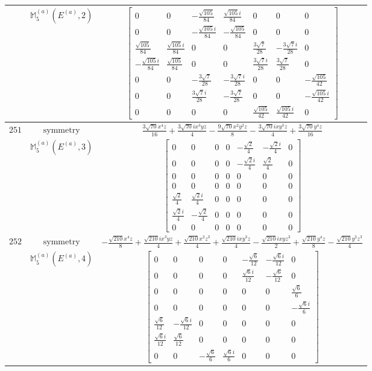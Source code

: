 \documentclass[fleqn,8pt,landscape]{jsarticle}
\begin{document}
\begin{longtable}{ccc}
$  $ & $ \mathbb{M}_{5}^{(a)}(E^{(a)},2) $ & $ \begin{bmatrix} 0 & 0 & - \frac{\sqrt{105}}{84} & \frac{\sqrt{105} i}{84} & 0 & 0 & 0 \\ 0 & 0 & - \frac{\sqrt{105} i}{84} & - \frac{\sqrt{105}}{84} & 0 & 0 & 0 \\ \frac{\sqrt{105}}{84} & \frac{\sqrt{105} i}{84} & 0 & 0 & \frac{3 \sqrt{7}}{28} & - \frac{3 \sqrt{7} i}{28} & 0 \\ - \frac{\sqrt{105} i}{84} & \frac{\sqrt{105}}{84} & 0 & 0 & \frac{3 \sqrt{7} i}{28} & \frac{3 \sqrt{7}}{28} & 0 \\ 0 & 0 & - \frac{3 \sqrt{7}}{28} & - \frac{3 \sqrt{7} i}{28} & 0 & 0 & - \frac{\sqrt{105}}{42} \\ 0 & 0 & \frac{3 \sqrt{7} i}{28} & - \frac{3 \sqrt{7}}{28} & 0 & 0 & - \frac{\sqrt{105} i}{42} \\ 0 & 0 & 0 & 0 & \frac{\sqrt{105}}{42} & \frac{\sqrt{105} i}{42} & 0 \end{bmatrix} $ \\ \hline
$ 251 $ & $ \text{symmetry} $ & $ \frac{3 \sqrt{70} x^{4} z}{16} + \frac{3 \sqrt{70} i x^{3} y z}{4} - \frac{9 \sqrt{70} x^{2} y^{2} z}{8} - \frac{3 \sqrt{70} i x y^{3} z}{4} + \frac{3 \sqrt{70} y^{4} z}{16} $ \\
$  $ & $ \mathbb{M}_{5}^{(a)}(E^{(a)},3) $ & $ \begin{bmatrix} 0 & 0 & 0 & 0 & - \frac{\sqrt{2}}{4} & - \frac{\sqrt{2} i}{4} & 0 \\ 0 & 0 & 0 & 0 & - \frac{\sqrt{2} i}{4} & \frac{\sqrt{2}}{4} & 0 \\ 0 & 0 & 0 & 0 & 0 & 0 & 0 \\ 0 & 0 & 0 & 0 & 0 & 0 & 0 \\ \frac{\sqrt{2}}{4} & \frac{\sqrt{2} i}{4} & 0 & 0 & 0 & 0 & 0 \\ \frac{\sqrt{2} i}{4} & - \frac{\sqrt{2}}{4} & 0 & 0 & 0 & 0 & 0 \\ 0 & 0 & 0 & 0 & 0 & 0 & 0 \end{bmatrix} $ \\ \hline
$ 252 $ & $ \text{symmetry} $ & $ - \frac{\sqrt{210} x^{4} z}{8} + \frac{\sqrt{210} i x^{3} y z}{4} + \frac{\sqrt{210} x^{2} z^{3}}{4} + \frac{\sqrt{210} i x y^{3} z}{4} - \frac{\sqrt{210} i x y z^{3}}{2} + \frac{\sqrt{210} y^{4} z}{8} - \frac{\sqrt{210} y^{2} z^{3}}{4} $ \\
$  $ & $ \mathbb{M}_{5}^{(a)}(E^{(a)},4) $ & $ \begin{bmatrix} 0 & 0 & 0 & 0 & - \frac{\sqrt{6}}{12} & - \frac{\sqrt{6} i}{12} & 0 \\ 0 & 0 & 0 & 0 & \frac{\sqrt{6} i}{12} & - \frac{\sqrt{6}}{12} & 0 \\ 0 & 0 & 0 & 0 & 0 & 0 & \frac{\sqrt{6}}{6} \\ 0 & 0 & 0 & 0 & 0 & 0 & - \frac{\sqrt{6} i}{6} \\ \frac{\sqrt{6}}{12} & - \frac{\sqrt{6} i}{12} & 0 & 0 & 0 & 0 & 0 \\ \frac{\sqrt{6} i}{12} & \frac{\sqrt{6}}{12} & 0 & 0 & 0 & 0 & 0 \\ 0 & 0 & - \frac{\sqrt{6}}{6} & \frac{\sqrt{6} i}{6} & 0 & 0 & 0 \end{bmatrix} $ \\ \hline

\end{longtable}
\end{document}
